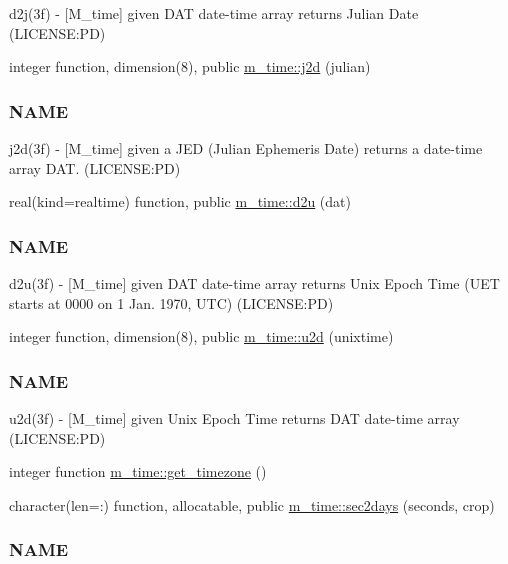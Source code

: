 \begin{DoxyCompactItemize}
\begin{DoxyCompactList}
d2j(3f) -\/ \mbox{[}M\+\_\+time\mbox{]} given D\+AT date-\/time array returns Julian Date (L\+I\+C\+E\+N\+SE\+:PD) \end{DoxyCompactList}\item 
integer function, dimension(8), public \mbox{\hyperlink{namespacem__time_a3ad5cad6df02c53e0429c3602a072e3c}{m\+\_\+time\+::j2d}} (julian)
\begin{DoxyCompactList}\small\item\em \subsubsection*{N\+A\+ME}

j2d(3f) -\/ \mbox{[}M\+\_\+time\mbox{]} given a J\+ED (Julian Ephemeris Date) returns a date-\/time array D\+AT. (L\+I\+C\+E\+N\+SE\+:PD) \end{DoxyCompactList}\item 
real(kind=realtime) function, public \mbox{\hyperlink{namespacem__time_a1506e2889a156387df4481ed0534be81}{m\+\_\+time\+::d2u}} (dat)
\begin{DoxyCompactList}\small\item\em \subsubsection*{N\+A\+ME}

d2u(3f) -\/ \mbox{[}M\+\_\+time\mbox{]} given D\+AT date-\/time array returns Unix Epoch Time (U\+ET starts at 0000 on 1 Jan. 1970, U\+TC) (L\+I\+C\+E\+N\+SE\+:PD) \end{DoxyCompactList}\item 
integer function, dimension(8), public \mbox{\hyperlink{namespacem__time_a083bc231f8ba1879d7f86ab424e77d6c}{m\+\_\+time\+::u2d}} (unixtime)
\begin{DoxyCompactList}\small\item\em \subsubsection*{N\+A\+ME}

u2d(3f) -\/ \mbox{[}M\+\_\+time\mbox{]} given Unix Epoch Time returns D\+AT date-\/time array (L\+I\+C\+E\+N\+SE\+:PD) \end{DoxyCompactList}\item 
integer function \mbox{\hyperlink{namespacem__time_a7903410a1d28bcdf3d33ab0c2d74b124}{m\+\_\+time\+::get\+\_\+timezone}} ()
\item 
character(len=\+:) function, allocatable, public \mbox{\hyperlink{namespacem__time_a7788285d79b8d58323b05e9a30a2d992}{m\+\_\+time\+::sec2days}} (seconds, crop)
\begin{DoxyCompactList}\small\item\em \subsubsection*{N\+A\+ME}


\end{DoxyCompactList}
\end{DoxyCompactItemize}
